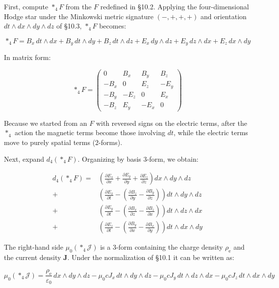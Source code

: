 First, compute \(\ast_4F\) from the \(F\) redefined in §10.2. Applying
the four-dimensional Hodge star under the Minkowski metric signature
\((-,+,+,+)\) and orientation \(dt\wedge dx\wedge dy\wedge dz\) of
§10.3, \(\ast_4F\) becomes:

\[
\ast_4F = B_x\,dt\wedge dx + B_y\,dt\wedge dy + B_z\,dt\wedge dz + E_x\,dy\wedge dz + E_y\,dz\wedge dx + E_z\,dx\wedge dy
\]

In matrix form:

\[\ast_4F = \begin{pmatrix}
0 & B_x & B_y & B_z \\
-B_x & 0 & E_z & -E_y \\
-B_y & -E_z & 0 & E_x \\
-B_z & E_y & -E_x & 0
\end{pmatrix}\]

Because we started from an \(F\) with reversed signs on the electric
terms, after the \(\ast_4\) action the magnetic terms become those
involving \(dt\), while the electric terms move to purely spatial terms
(\(2\)-forms).

Next, expand \(d_4(\ast_4F)\). Organizing by basis \(3\)-form, we
obtain:

\[\begin{aligned}
d_4(\ast_4F) = &\left(\frac{\partial E_x}{\partial x} + \frac{\partial E_y}{\partial y} + \frac{\partial E_z}{\partial z}\right) dx\wedge dy\wedge dz \\
{+} &\left(\frac{\partial E_x}{\partial t} - \left(\frac{\partial B_z}{\partial y} - \frac{\partial B_y}{\partial z}\right)\right) dt\wedge dy\wedge dz \\
{+} &\left(\frac{\partial E_y}{\partial t} - \left(\frac{\partial B_x}{\partial z} - \frac{\partial B_z}{\partial x}\right)\right) dt\wedge dz\wedge dx \\
{+} &\left(\frac{\partial E_z}{\partial t} - \left(\frac{\partial B_y}{\partial x} - \frac{\partial B_x}{\partial y}\right)\right) dt\wedge dx\wedge dy
\end{aligned}\]

The right-hand side \(\mu_0(\ast_4\mathcal{J})\) is a \(3\)-form
containing the charge density \(\rho_{\mathrm e}\) and the current
density \(\mathbf{J}\). Under the normalization of §10.1 it can be
written as:

\[
\mu_0(\ast_4\mathcal{J}) = \frac{\rho_{\mathrm e}}{\varepsilon_0}\,dx\wedge dy\wedge dz - \mu_0 c J_x\,dt\wedge dy\wedge dz - \mu_0 c J_y\,dt\wedge dz\wedge dx - \mu_0 c J_z\,dt\wedge dx\wedge dy
\]

